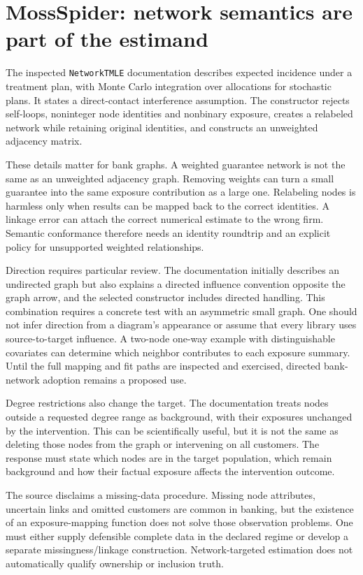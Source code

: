 \section{MossSpider: network semantics are part of the estimand}

The inspected \texttt{NetworkTMLE} documentation describes expected incidence
under a treatment plan, with Monte Carlo integration over allocations for
stochastic plans. It states a direct-contact interference assumption. The
constructor rejects self-loops, noninteger node identities and nonbinary
exposure, creates a relabeled network while retaining original identities,
and constructs an unweighted adjacency matrix.\cite{v13_sw_mossspider}

These details matter for bank graphs. A weighted guarantee network is not the
same as an unweighted adjacency graph. Removing weights can turn a small
guarantee into the same exposure contribution as a large one. Relabeling nodes
is harmless only when results can be mapped back to the correct identities.
A linkage error can attach the correct numerical estimate to the wrong firm.
Semantic conformance therefore needs an identity roundtrip and an explicit
policy for unsupported weighted relationships.

Direction requires particular review. The documentation initially describes an
undirected graph but also explains a directed influence convention opposite
the graph arrow, and the selected constructor includes directed handling. This
combination requires a concrete test with an asymmetric small graph. One should
not infer direction from a diagram's appearance or assume that every library
uses source-to-target influence. A two-node one-way example with distinguishable
covariates can determine which neighbor contributes to each exposure summary.
Until the full mapping and fit paths are inspected and exercised, directed
bank-network adoption remains a proposed use.\cite{v13_sw_mossspider}

Degree restrictions also change the target. The documentation treats nodes
outside a requested degree range as background, with their exposures unchanged
by the intervention. This can be scientifically useful, but it is not the
same as deleting those nodes from the graph or intervening on all customers.
The response must state which nodes are in the target population, which remain
background and how their factual exposure affects the intervention outcome.

The source disclaims a missing-data procedure. Missing node attributes,
uncertain links and omitted customers are common in banking, but the existence
of an exposure-mapping function does not solve those observation problems.
One must either supply defensible complete data in the declared regime or
develop a separate missingness/linkage construction. Network-targeted estimation
does not automatically qualify ownership or inclusion truth.

